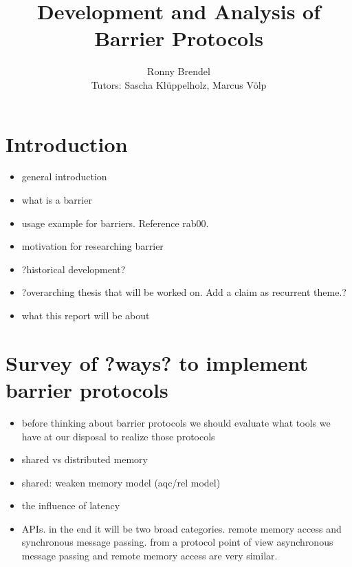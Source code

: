\documentclass[a4paper, 10pt]{article}
\title{Development and Analysis of Barrier Protocols}
\author{Ronny Brendel\\Tutors: Sascha Kl\"uppelholz, Marcus V\"olp}
\begin{document}
\maketitle

\pagebreak

\tableofcontents

\pagebreak

\begin{abstract}
\end{abstract}

\section{Introduction}
\begin{itemize}
	\item general introduction
	\item what is a barrier
	\item usage example for barriers. Reference rab00.
	\item motivation for researching barrier
	\item ?historical development?
	\item ?overarching thesis that will be worked on. Add a claim as recurrent theme.?
	\item what this report will be about
\end{itemize}


\section{Survey of ?ways? to implement barrier protocols}
\begin{itemize}
	\item before thinking about barrier protocols we should evaluate what tools we have at our disposal to realize those protocols
	\item shared vs distributed memory
	\item shared: weaken memory model (aqc/rel model)
	\item the influence of latency
	\item APIs. in the end it will be two broad categories. remote memory access and synchronous message passing. from a protocol point of view asynchronous message passing and remote memory access are very similar.
\end{itemize}
\end{document}
